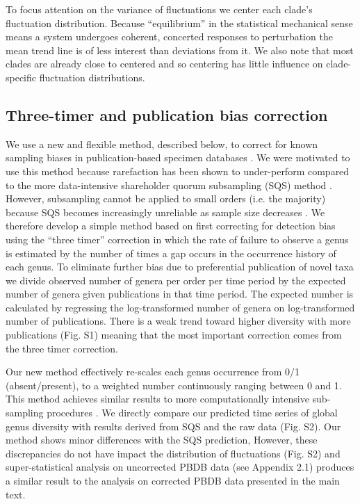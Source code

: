 \documentclass[12pt]{article}
\let\citep=\cite
\begin{document}
To focus attention on the variance of fluctuations we center each
clade's fluctuation distribution. Because ``equilibrium'' in the
statistical mechanical sense means a system undergoes coherent,
concerted responses to perturbation the mean trend line is of less
interest than deviations from it. We also note that most clades are
already close to centered and so centering has little influence on
clade-specific fluctuation distributions.

\subsection*{Three-timer and publication bias correction} 
\label{sec:3TP}
We use a new and flexible method, described below, to correct for
known sampling biases in publication-based specimen databases
\citep{alroy08, alroy2010}.  We were motivated to use this method
because rarefaction has been shown to under-perform compared to the
more data-intensive shareholder quorum subsampling (SQS) method
\citep{alroy2010}.  However, subsampling cannot be applied to small
orders (i.e. the majority) because SQS becomes increasingly unreliable
as sample size decreases \citep{alroy2010}.  We therefore develop a
simple method based on first correcting for detection bias using the
``three timer'' correction \citep{alroy08} in which the rate of failure
to observe a genus is estimated by the number of times a gap occurs in
the occurrence history of each genus. To eliminate further bias due to
preferential publication of novel taxa we divide observed number of
genera per order per time period by the expected number of genera
given publications in that time period.  The expected number is
calculated by regressing the log-transformed number of genera on
log-transformed number of publications. There is a weak trend toward
higher diversity with more publications (Fig. S1)
meaning that the most important correction comes from the three timer
correction.

Our new method effectively re-scales each genus occurrence from 0/1
(absent/present), to a weighted number continuously ranging between 0
and 1.  This method achieves similar results to more computationally
intensive sub-sampling procedures \citep{alroy08, alroy2010}. We
directly compare our predicted time series of global genus diversity
with results derived from SQS \citep{alroy2010} and the raw data
(Fig. S2).  Our method shows minor differences with
the SQS prediction, However, these discrepancies do not have impact
the distribution of fluctuations (Fig. S2) and super-statistical
analysis on uncorrected PBDB data (see Appendix 2.1) produces a
similar result to the analysis on corrected PBDB data presented in the
main text.
\end{document}
